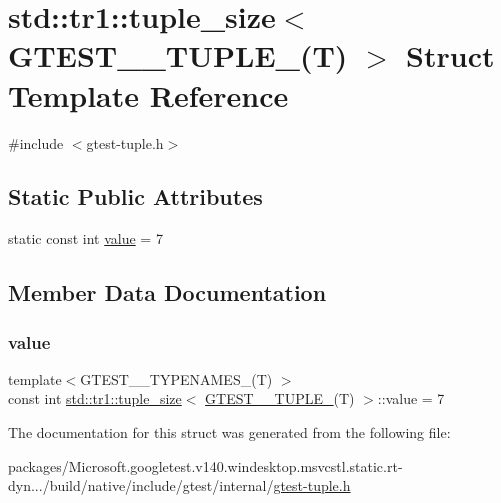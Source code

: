 \hypertarget{structstd_1_1tr1_1_1tuple__size_3_01_g_t_e_s_t__7___t_u_p_l_e___07_t_08_01_4}{}\section{std\+::tr1\+::tuple\+\_\+size$<$ G\+T\+E\+S\+T\+\_\+\_\+\+T\+U\+P\+L\+E\+\_\+(T) $>$ Struct Template Reference}
\label{structstd_1_1tr1_1_1tuple__size_3_01_g_t_e_s_t__7___t_u_p_l_e___07_t_08_01_4}


{\ttfamily \#include $<$gtest-\/tuple.\+h$>$}

\subsection*{Static Public Attributes}
\begin{DoxyCompactItemize}
\item 
static const int \mbox{\hyperlink{structstd_1_1tr1_1_1tuple__size_3_01_g_t_e_s_t__7___t_u_p_l_e___07_t_08_01_4_a9ccabab5024fd1be44276a58c88817c3}{value}} = 7
\end{DoxyCompactItemize}


\subsection{Member Data Documentation}
\mbox{\label{structstd_1_1tr1_1_1tuple__size_3_01_g_t_e_s_t__7___t_u_p_l_e___07_t_08_01_4_a9ccabab5024fd1be44276a58c88817c3}} 
\subsubsection{\texorpdfstring{value}{value}}
{\footnotesize\ttfamily template$<$G\+T\+E\+S\+T\+\_\+\_\+\+T\+Y\+P\+E\+N\+A\+M\+E\+S\+\_\+(\+T) $>$ \\
const int \mbox{\hyperlink{structstd_1_1tr1_1_1tuple__size}{std\+::tr1\+::tuple\+\_\+size}}$<$ \mbox{\hyperlink{namespacestd_1_1tr1_ab451b390a95ee0555d7a43b67ea348aa}{G\+T\+E\+S\+T\+\_\+\_\+\+T\+U\+P\+L\+E\+\_\+}}(T) $>$\+::value = 7\hspace{0.3cm}{\ttfamily [static]}}



The documentation for this struct was generated from the following file\+:\begin{DoxyCompactItemize}
\item 
packages/\+Microsoft.\+googletest.\+v140.\+windesktop.\+msvcstl.\+static.\+rt-\/dyn.../build/native/include/gtest/internal/\mbox{\hyperlink{gtest-tuple_8h}{gtest-\/tuple.\+h}}\end{DoxyCompactItemize}
